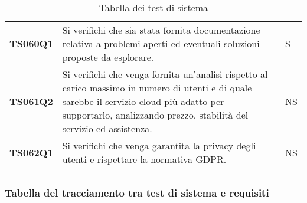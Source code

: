 \documentclass[../../piano-di-qualifica.tex]{subfiles}
\begin{document}
\begin{longtable}[H]{>{\centering\bfseries}m{3cm} >{}m{10cm} >{\centering\arraybackslash}m{3cm}}
  TS060Q1            & Si verifichi che sia stata fornita documentazione relativa a problemi aperti ed eventuali soluzioni proposte da esplorare.
                     & S                                                                                                                                                                                                                                                   \\

  TS061Q2            & Si verifichi che venga fornita un'analisi rispetto al carico massimo in numero di utenti e di quale sarebbe il servizio cloud più adatto per supportarlo, analizzando prezzo, stabilità del servizio ed assistenza.
                     & NS                                                                                                                                                                                                                                                  \\

  TS062Q1            & Si verifichi che venga garantita la privacy degli utenti e rispettare la normativa GDPR\@.
                     & NS                                                                                                                                                                                                                                                  \\
  \rowcolor{white}
  \caption{Tabella dei test di sistema}%
  \label{tab:test_sistema}
\end{longtable}


\newpage
\subsubsection{Tabella del tracciamento tra test di sistema e requisiti}%
\label{subsub:tabella_tracciamento_test_sistema_requisiti}
\end{document}

